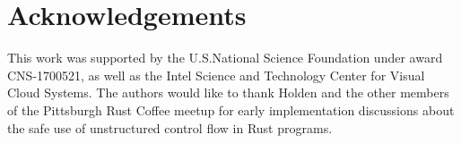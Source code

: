 \section*{Acknowledgements}

This work was supported by the U.S.\@ National Science Foundation under award
CNS-1700521, as well as the Intel Science and Technology Center for Visual Cloud
Systems.  The authors would like to thank Holden and the other members of the
Pittsburgh Rust Coffee meetup for early implementation discussions about the safe use
of unstructured control flow in Rust programs.
